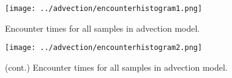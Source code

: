 \begin{figure}
  \centering
  \texttt{[image: ../advection/encounterhistogram1.png]}
  \caption[Encounter times for all samples in advection model.]{Encounter times for all samples in advection model.}
\end{figure}
  
\begin{figure}
  \ContinuedFloat
  \centering
  \texttt{[image: ../advection/encounterhistogram2.png]}
  \caption[]{(cont.) Encounter times for all samples in advection model.}
  \label{fig:encounterhistograms}
\end{figure}
